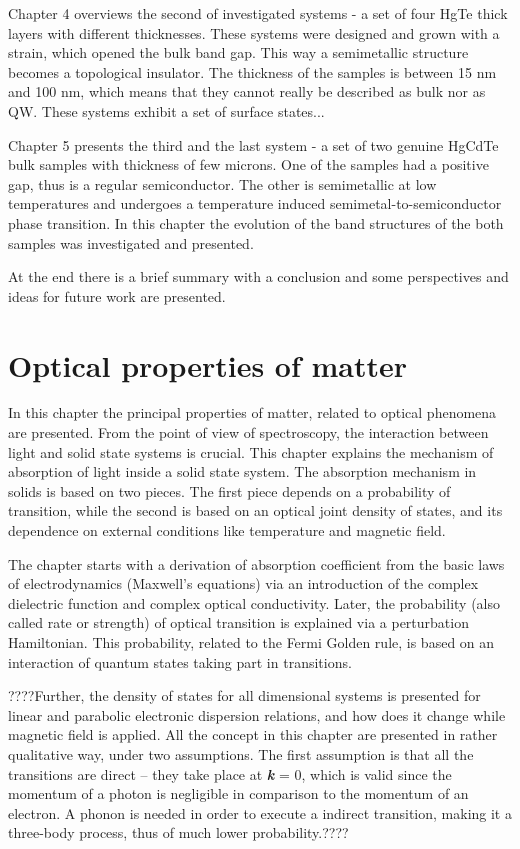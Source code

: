 \documentclass[titlepage,a4paper]{book}
\newcommand{\wciecie}{\quad\phantom{v}}
\begin{document}
Chapter 4 overviews the second of investigated systems - a set of four HgTe thick layers with different thicknesses. These systems were designed and grown with a strain, which opened the bulk band gap. This way a semimetallic structure becomes a topological insulator. The thickness of the samples is between 15 nm and 100 nm, which means that they cannot really be described as bulk nor as QW. These systems exhibit a set of surface states... 

Chapter 5 presents the third and the last system - a set of two genuine HgCdTe bulk samples with thickness of few microns. One of the samples had a positive gap, thus is a regular semiconductor. The other is semimetallic at low temperatures and undergoes a temperature induced semimetal-to-semiconductor phase transition. In this chapter the evolution of the band structures of the both samples was investigated and presented.

At the end there is a brief summary with a conclusion and some perspectives and ideas for future work are presented.

\chapter{Optical properties of matter}
\label{chpt:optical}
\wciecie
In this chapter the principal properties of matter, related to optical phenomena are presented. From the point of view of spectroscopy, the interaction between light and solid state systems is crucial. This chapter explains the mechanism of absorption of light inside a solid state system. The absorption mechanism in solids is based on two pieces. The first piece depends on a probability of transition, while the second is based on an optical joint density of states, and its dependence on external conditions like temperature and magnetic field. 

The chapter starts with a derivation of absorption coefficient from the basic laws of electrodynamics (Maxwell's equations) via an introduction of the complex dielectric function and complex optical conductivity. Later, the probability (also called rate or strength) of optical transition is explained via a perturbation Hamiltonian. This probability, related to the Fermi Golden rule, is based on an interaction of quantum states taking part in transitions. 

????Further, the density of states for all dimensional systems is presented for linear and parabolic electronic dispersion relations, and how does it change while magnetic field is applied. All the concept in this chapter are presented in rather qualitative way, under two assumptions. The first assumption is that all the transitions are direct -- they take place at \textbf{\textit{k}} = 0, which is valid since the momentum of a photon is negligible in comparison to the momentum of an electron. A phonon is needed in order to execute a indirect transition, making it a three-body process, thus of much lower probability.???? 
\end{document}
